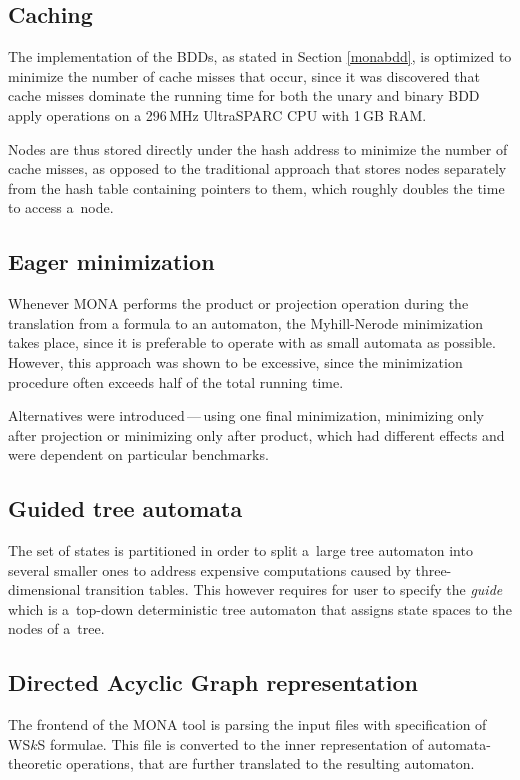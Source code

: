 \subsection{Caching}
The implementation of the BDDs, as stated in Section \ref{monabdd}, is optimized
to minimize the number of cache misses that occur, since it was discovered that
cache misses dominate the running time for both the unary and binary BDD apply
operations on a 296\,MHz UltraSPARC CPU with 1\,GB
RAM.

Nodes are thus stored directly under the hash address to minimize the 
number of cache misses, as opposed to the traditional approach that stores nodes
separately from the hash table containing pointers to them, which roughly doubles the time to
access a~node.

\subsection{Eager minimization}
Whenever MONA performs the product or projection operation during the
translation from a formula to an automaton, the Myhill-Nerode minimization takes
place, since it is preferable to operate with as small automata as possible.
However, this approach was shown to be excessive, since the minimization
procedure often exceeds half of the total running time.

Alternatives were introduced\,---\,using one final minimization, minimizing only
after projection or minimizing only after product, which had different effects
and were dependent on particular benchmarks.

\subsection{Guided tree automata}

The set of states is partitioned in order to split a~large tree automaton into
several smaller ones to address expensive computations caused by
three-dimensional transition tables. This however requires for user to specify the \emph{guide}
which is a~top-down deterministic tree automaton that assigns state spaces to
the nodes of a~tree.

\subsection{Directed Acyclic Graph representation}\label{dag}

The frontend of the MONA tool is parsing the input files with specification of
WS$k$S formulae. This file is converted to the inner representation of
automata-theoretic operations, that are further translated to the resulting
automaton.

